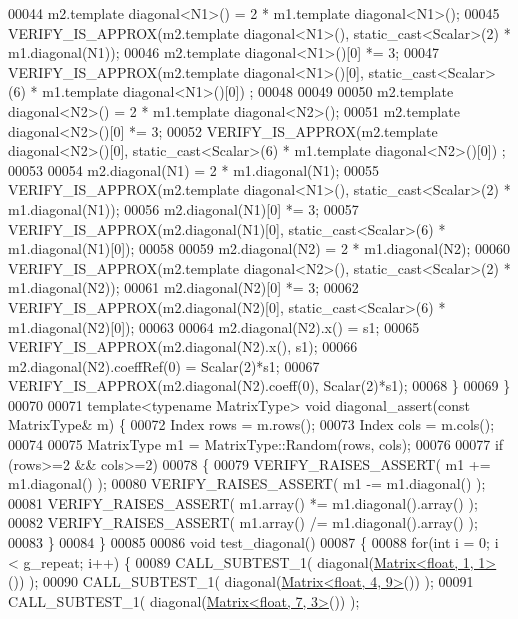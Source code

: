\begin{DoxyCode}
00044     m2.template diagonal<N1>() = 2 * m1.template diagonal<N1>();
00045     VERIFY\_IS\_APPROX(m2.template diagonal<N1>(), static\_cast<Scalar>(2) * m1.diagonal(N1));
00046     m2.template diagonal<N1>()[0] *= 3;
00047     VERIFY\_IS\_APPROX(m2.template diagonal<N1>()[0], static\_cast<Scalar>(6) * m1.template diagonal<N1>()[0])
      ;
00048 
00049 
00050     m2.template diagonal<N2>() = 2 * m1.template diagonal<N2>();
00051     m2.template diagonal<N2>()[0] *= 3;
00052     VERIFY\_IS\_APPROX(m2.template diagonal<N2>()[0], static\_cast<Scalar>(6) * m1.template diagonal<N2>()[0])
      ;
00053 
00054     m2.diagonal(N1) = 2 * m1.diagonal(N1);
00055     VERIFY\_IS\_APPROX(m2.template diagonal<N1>(), static\_cast<Scalar>(2) * m1.diagonal(N1));
00056     m2.diagonal(N1)[0] *= 3;
00057     VERIFY\_IS\_APPROX(m2.diagonal(N1)[0], \textcolor{keyword}{static\_cast<}Scalar\textcolor{keyword}{>}(6) * m1.diagonal(N1)[0]);
00058 
00059     m2.diagonal(N2) = 2 * m1.diagonal(N2);
00060     VERIFY\_IS\_APPROX(m2.template diagonal<N2>(), static\_cast<Scalar>(2) * m1.diagonal(N2));
00061     m2.diagonal(N2)[0] *= 3;
00062     VERIFY\_IS\_APPROX(m2.diagonal(N2)[0], \textcolor{keyword}{static\_cast<}Scalar\textcolor{keyword}{>}(6) * m1.diagonal(N2)[0]);
00063 
00064     m2.diagonal(N2).x() = s1;
00065     VERIFY\_IS\_APPROX(m2.diagonal(N2).x(), s1);
00066     m2.diagonal(N2).coeffRef(0) = Scalar(2)*s1;
00067     VERIFY\_IS\_APPROX(m2.diagonal(N2).coeff(0), Scalar(2)*s1);
00068   \}
00069 \}
00070 
00071 \textcolor{keyword}{template}<\textcolor{keyword}{typename} MatrixType> \textcolor{keywordtype}{void} diagonal\_assert(\textcolor{keyword}{const} MatrixType& m) \{
00072   Index rows = m.rows();
00073   Index cols = m.cols();
00074 
00075   MatrixType m1 = MatrixType::Random(rows, cols);
00076 
00077   \textcolor{keywordflow}{if} (rows>=2 && cols>=2)
00078   \{
00079     VERIFY\_RAISES\_ASSERT( m1 += m1.diagonal() );
00080     VERIFY\_RAISES\_ASSERT( m1 -= m1.diagonal() );
00081     VERIFY\_RAISES\_ASSERT( m1.array() *= m1.diagonal().array() );
00082     VERIFY\_RAISES\_ASSERT( m1.array() /= m1.diagonal().array() );
00083   \}
00084 \}
00085 
00086 \textcolor{keywordtype}{void} test\_diagonal()
00087 \{
00088   \textcolor{keywordflow}{for}(\textcolor{keywordtype}{int} i = 0; i < g\_repeat; i++) \{
00089     CALL\_SUBTEST\_1( diagonal(\hyperlink{group___core___module_class_eigen_1_1_matrix}{Matrix<float, 1, 1>}()) );
00090     CALL\_SUBTEST\_1( diagonal(\hyperlink{group___core___module_class_eigen_1_1_matrix}{Matrix<float, 4, 9>}()) );
00091     CALL\_SUBTEST\_1( diagonal(\hyperlink{group___core___module_class_eigen_1_1_matrix}{Matrix<float, 7, 3>}()) );

\end{DoxyCode}
